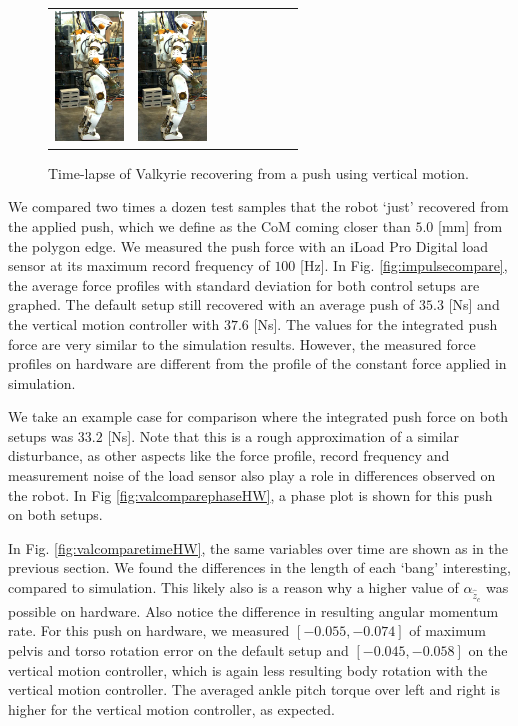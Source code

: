 \documentclass[letterpaper, 10 pt, conference]{ieeeconf}  %
\begin{document}
\begin{figure}[h]
\begin{tabular}{cccccccc}
    \includegraphics[width=0.72in]{val7c} &
    \includegraphics[width=0.72in]{val8c} \\
  \end{tabular}
  \caption{Time-lapse of Valkyrie recovering from a push using vertical motion.}
  \label{fig:val}
\end{figure}

We compared two times a dozen test samples that the robot `just' recovered from the applied push, which we define as the CoM coming closer than $5.0$ [mm] from the polygon edge. We measured the push force with an iLoad Pro Digital load sensor at its maximum record frequency of $100$ [Hz]. In Fig. \ref{fig:impulsecompare}, the average force profiles with standard deviation for both control setups are graphed. The default setup still recovered with an average push of $35.3$ [Ns] and the vertical motion controller with $37.6$ [Ns]. The values for the integrated push force are very similar to the simulation results. However, the measured force profiles on hardware are different from the profile of the constant force applied in simulation.

We take an example case for comparison where the integrated push force on both setups was $33.2$ [Ns]. Note that this is a rough approximation of a similar disturbance, as other aspects like the force profile, record frequency and measurement noise of the load sensor also play a role in differences observed on the robot. In Fig \ref{fig:valcomparephaseHW}, a phase plot is shown for this push on both setups. 

In Fig. \ref{fig:valcomparetimeHW}, the same variables over time are shown as in the previous section. 
We found the differences in the length of each `bang' interesting, compared to simulation. This likely also is a reason why a higher value of $\alpha_{\hat{\ddot{z}}_{c}}$ was possible on hardware. Also notice the difference in resulting angular momentum rate. For this push on hardware, we measured $[-0.055,-0.074]$ of maximum pelvis and torso rotation error on the default setup and $[-0.045,-0.058]$ on the vertical motion controller, which is again less resulting body rotation with the vertical motion controller. The averaged ankle pitch torque over left and right is higher for the vertical motion controller, as expected.
\end{document}
